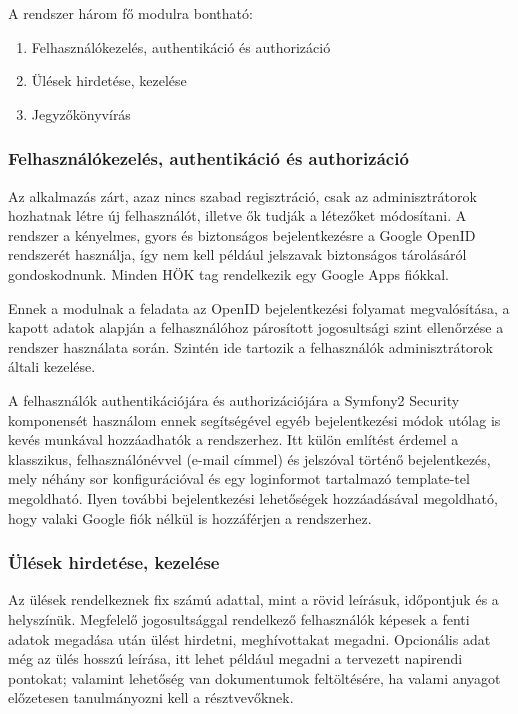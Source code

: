\documentclass[a4paper,12pt,oneside]{report}
\begin{document}
A rendszer három fő modulra bontható:

\begin{enumerate}
    \item Felhasználókezelés, authentikáció és authorizáció
    \item Ülések hirdetése, kezelése
    \item Jegyzőkönyvírás
\end{enumerate}

\subsubsection{Felhasználókezelés, authentikáció és authorizáció}

Az alkalmazás zárt, azaz nincs szabad regisztráció, csak az adminisztrátorok hozhatnak létre új felhasználót, illetve ők tudják a létezőket módosítani. A rendszer a kényelmes, gyors és biztonságos bejelentkezésre a Google OpenID rendszerét használja, így nem kell például jelszavak biztonságos tárolásáról gondoskodnunk. Minden HÖK tag rendelkezik egy Google Apps fiókkal.

Ennek a modulnak a feladata az OpenID bejelentkezési folyamat megvalósítása, a kapott adatok alapján a felhasználóhoz párosított jogosultsági szint ellenőrzése a rendszer használata során. Szintén ide tartozik a felhasználók adminisztrátorok általi kezelése.

A felhasználók authentikációjára és authorizációjára a Symfony2 Security komponensét használom \textendash{} ennek segítségével egyéb bejelentkezési módok utólag is kevés munkával hozzáadhatók a rendszerhez. Itt külön említést érdemel a klasszikus, felhasználónévvel (e-mail címmel) és jelszóval történő bejelentkezés, mely néhány sor konfigurációval és egy loginformot tartalmazó template-tel megoldható. Ilyen további bejelentkezési lehetőségek hozzáadásával megoldható, hogy valaki Google fiók nélkül is hozzáférjen a rendszerhez.

\subsubsection{Ülések hirdetése, kezelése}

Az ülések rendelkeznek fix számú adattal, mint a rövid leírásuk, időpontjuk és a helyszínük. Megfelelő jogosultsággal rendelkező felhasználók képesek a fenti adatok megadása után ülést hirdetni, meghívottakat megadni. Opcionális adat még az ülés hosszú leírása, itt lehet például megadni a tervezett napirendi pontokat; valamint lehetőség van dokumentumok feltöltésére, ha valami anyagot előzetesen tanulmányozni kell a résztvevőknek.
\end{document}
